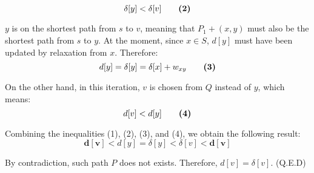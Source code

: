 \begin{itemize}
        \[
          \delta[y] < \delta[v] \qquad\mbox{\textbf{{(2)}}}
        \]
        \par $y$ is on the shortest path from $s$ to $v$, meaning that $P_1 +
        (x, y)$ must also be the shortest path from $s$ to $y$. At the moment,
        since $x \in S$, $d[y]$ must have been updated by relaxation from $x$.
        Therefore:
        \[
          d[y] = \delta[y] = \delta[x] + w_{xy} \qquad\mbox{\textbf{{(3)}}}
        \]
        \par On the other hand, in this iteration, $v$ is chosen from $Q$
        instead of $y$, which means:
        \[
          d[v] < d[y] \qquad\mbox{\textbf{{(4)}}}
        \]
        \par Combining the inequalities (1), (2), (3), and (4), we obtain the
        following result:
        \[
          \bm{d[v]} < d[y] = \delta[y] < \delta[v] < \bm{d[v]}
        \]
        \par By contradiction, such path $P$ does not exists. Therefore,
        $d[v] = \delta[v]$. (Q.E.D)
    \end{itemize}
